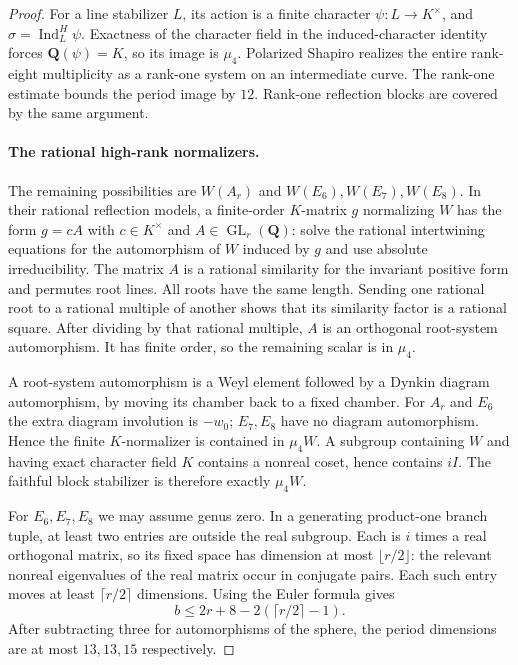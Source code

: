 \documentclass[11pt]{article}
\theoremstyle{definition}
\theoremstyle{remark}
\newcommand{\Q}{\mathbf Q}
\begin{document}
\begin{proof}
For a line stabilizer $L$, its action is a finite character
$\psi:L\to K^\times$, and $\sigma=\operatorname{Ind}_L^H\psi$.
Exactness of the character field in the induced-character identity forces
$\Q(\psi)=K$, so its image is $\mu_4$. Polarized Shapiro realizes
the entire rank-eight multiplicity as a rank-one system on an
intermediate curve. The rank-one estimate bounds the period image by $12$.
Rank-one reflection blocks are covered by the same argument.

\paragraph{The rational high-rank normalizers.}
The remaining possibilities are $W(A_r)$ and $W(E_6),W(E_7),W(E_8)$.
In their rational reflection models, a finite-order $K$-matrix $g$
normalizing $W$ has the form $g=cA$ with $c\in K^\times$ and
$A\in\operatorname{GL}_r(\Q)$: solve the rational intertwining equations for the
automorphism of $W$ induced by $g$ and use absolute irreducibility.
The matrix $A$ is a rational similarity for the invariant positive
form and permutes root lines. All roots have the same length. Sending
one rational root to a rational multiple of another shows that its
similarity factor is a rational square. After dividing by that
rational multiple, $A$ is an orthogonal root-system automorphism.
It has finite order, so the remaining scalar is in $\mu_4$.

A root-system automorphism is a Weyl element followed by a Dynkin
diagram automorphism, by moving its chamber back to a fixed chamber.
For $A_r$ and $E_6$ the extra diagram involution is $-w_0$;
$E_7,E_8$ have no diagram automorphism. Hence the finite $K$-normalizer
is contained in $\mu_4W$. A subgroup containing $W$ and having exact
character field $K$ contains a nonreal coset, hence contains $iI$.
The faithful block stabilizer is therefore exactly $\mu_4W$.

For $E_6,E_7,E_8$ we may assume genus zero. In a generating
product-one branch tuple, at least two entries are outside the real
subgroup. Each is $i$ times a real orthogonal matrix, so its fixed
space has dimension at most $\lfloor r/2\rfloor$: the relevant
nonreal eigenvalues of the real matrix occur in conjugate pairs.
Each such entry moves at least $\lceil r/2\rceil$ dimensions.
Using the Euler formula gives
\[
 b\le2r+8-2(\lceil r/2\rceil-1).
\]
After subtracting three for automorphisms of the sphere, the period
dimensions are at most $13,13,15$ respectively.


\end{proof}
\end{document}
